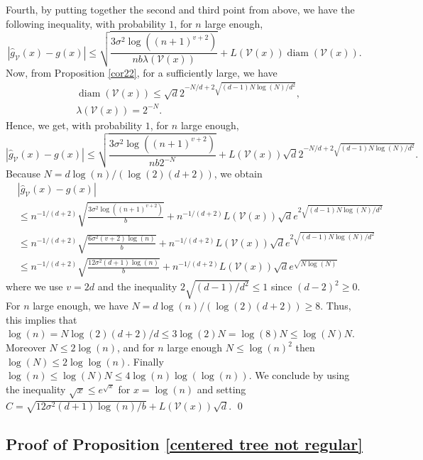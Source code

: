 \documentclass[paper=a4, fontsize=11pt]{scrartcl}
\newcommand{\diam}{\operatorname{diam}}
\begin{document}
Fourth, by putting together the second and third point from above, we have the following inequality, with probability $1$, for $n $ large enough,
$$|\hat g_{\mathcal V}(x) - g(x)| \leq  \sqrt{\frac{ 3 \sigma^2 \log\left( (n+1)^{v+2} \right)}{n  b \lambda ( \mathcal V(x)) }} + L(\mathcal V(x)) \diam (\mathcal V(x)).$$
Now, from Proposition \ref{cor22}, for a sufficiently large, we have
\begin{align*}
& \diam (\mathcal{V}(x)) \leq \sqrt d 2^{-N/d+2\sqrt{(d-1)N\log(N)/d^2}}, \\
& \lambda(\mathcal{V}(x)) = 2^{-N}.
\end{align*}
Hence, we get, with probability $1$, for $n$ large enough,
$$| \hat g_{\mathcal V}(x) - g(x)| \leq \sqrt{\frac{ 3 \sigma^2 \log\left( {(n+1)^{v+2}} \right)}{n b 2^{-N}}} + L(\mathcal V(x)) \sqrt d 2^{-N/d+2\sqrt{(d-1)N\log(N)/d^2}}.$$
Because \( N = d\log(n)/(\log(2)(d+2)) \), we obtain
\begin{align*}
 &   | \hat g_{\mathcal V}(x) - g(x)| \\&\leq n^{-1/(d+2)} \sqrt{\frac{ 3 \sigma^2 \log\left( {(n+1)^{v+2}} \right)}{b}} + n^{-1/(d+2)} L(\mathcal V(x)) \sqrt d e^{2\sqrt{(d-1)N\log(N)/d^2}}\\
& \leq n^{-1/(d+2)} \sqrt{\frac{ 6 \sigma^2 (v+2)\log\left( n \right)}{b}} + n^{-1/(d+2)} L(\mathcal V(x)) \sqrt d e^{2\sqrt{(d-1)N\log(N)/d^2}}
\\
& \leq n^{-1/(d+2)} \sqrt{\frac{ 12 \sigma^2 (d+1)\log\left( n \right)}{b}} + n^{-1/(d+2)} L(\mathcal V(x)) \sqrt d e^{\sqrt{N\log(N)}}
\end{align*}
where we use $v = 2d$ and the inequality $2 \sqrt{(d-1)/d^2} \leq 1$ since $(d-2)^2 \geq 0$.
For $n$ large enough, we have \( N = d\log(n)/(\log(2)(d+2)) \geq 8.\) Thus, this implies that $\log(n) = N \log(2) (d+2)/ d \leq 3 \log(2) N = \log(8) N \leq \log(N) N$. 
Moreover $N \leq 2 \log(n)$, and for $n$ large enough $N \leq \log(n)^2$ then $\log(N) \leq 2 \log \log(n).$ Finally $\log(n) \leq \log(N) N \leq  4 \log(n) \log(\log(n)).$ We conclude by using the inequality $\sqrt{x} \leq e^{\sqrt{x}}$ for $x= \log(n)$ and setting $C = \sqrt{{12 \sigma^2 (d+1)\log\left( n \right)}/b} +  L(\mathcal V(x)) \sqrt d$.
\qed

\subsection*{Proof of Proposition \ref{centered tree not regular}}
\end{document}

